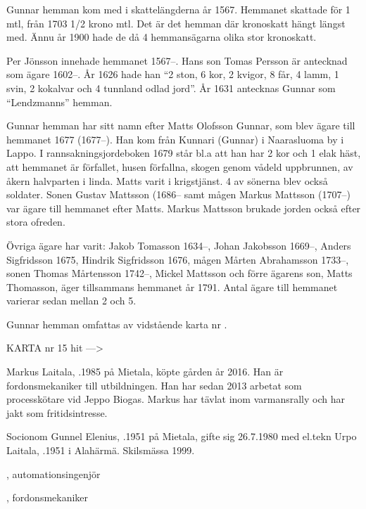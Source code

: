 
Gunnar hemman kom med i skattelängderna år 1567. Hemmanet skattade för 1 mtl, från 1703  1/2 krono mtl. Det är det hemman där kronoskatt hängt längst med. Ännu år 1900 hade de då 4 hemmansägarna olika stor kronoskatt.

Per Jönsson innehade hemmanet 1567--. Hans son Tomas Persson är antecknad som ägare 1602--. År 1626 hade han ``2 ston, 6 kor, 2 kvigor, 8 får, 4 lamm, 1 svin, 2 kokalvar och 4 tunnland odlad jord''. År 1631 antecknas Gunnar som ``Lendzmanns'' hemman.

Gunnar hemman har sitt namn efter Matts Olofsson Gunnar, som blev ägare till hemmanet 1677 (1677--). Han kom från Kunnari (Gunnar) i Naarasluoma by i Lappo. I rannsakningsjordeboken 1679 står bl.a att han har 2 kor och 1 elak häst, att hemmanet är förfallet, husen förfallna, skogen genom vådeld uppbrunnen, av åkern halvparten i linda. Matts varit i krigstjänst. 4 av sönerna blev också soldater. Sonen Gustav Mattsson (1686-- samt mågen Markus Mattsson (1707--) var ägare till hemmanet efter Matts. Markus Mattsson brukade jorden också efter stora ofreden.

Övriga ägare har varit: Jakob Tomasson 1634--, Johan Jakobsson 1669--, Anders Sigfridsson 1675,  Hindrik Sigfridsson 1676,  mågen Mårten Abrahamsson 1733--, sonen Thomas Mårtensson 1742--, Mickel Mattsson och förre ägarens son, Matts Thomasson, äger tillsammans hemmanet år 1791. Antal ägare till hemmanet varierar sedan mellan 2 och 5.


Gunnar hemman omfattas av vidstående karta nr .


KARTA nr 15 hit --->







Markus Laitala, .1985 på Mietala, köpte gården år 2016. Han är fordonsmekaniker till utbildningen. Han har sedan 2013 arbetat som processkötare vid Jeppo Biogas. Markus har tävlat inom varmansrally och har jakt som fritidsintresse.\jhvspace{}


Socionom Gunnel Elenius, .1951 på Mietala, gifte sig 26.7.1980 med el.tekn Urpo Laitala, .1951 i Alahärmä. Skilsmässa 1999.
\begin{jhchildren}
  \item {}, automationsingenjör
  \item {}, fordonsmekaniker
\end{jhchildren}

